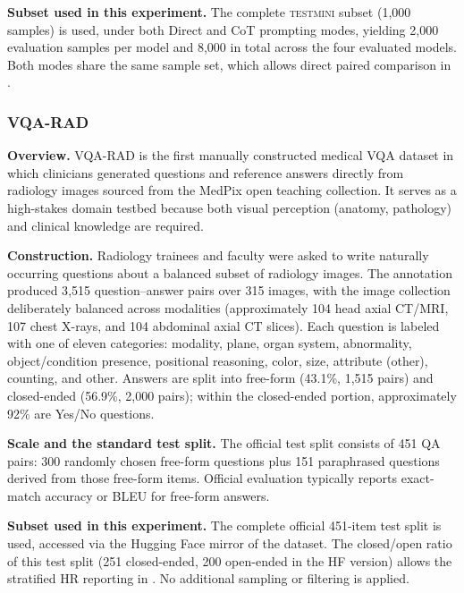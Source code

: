 \textbf{Subset used in this experiment.}
The complete \textsc{testmini} subset (1{,}000 samples) is used,
under both Direct and CoT prompting modes,
yielding 2{,}000 evaluation samples per model
and 8{,}000 in total across the four evaluated models.
Both modes share the same sample set,
which allows direct paired comparison
in .

\subsubsection{VQA-RAD}

\textbf{Overview.}
VQA-RAD \citep{lauDatasetClinicallyGenerated2018}
is the first manually constructed medical VQA dataset
in which clinicians generated questions and reference answers
directly from radiology images
sourced from the MedPix open teaching collection.
It serves as a high-stakes domain testbed
because both visual perception (anatomy, pathology)
and clinical knowledge are required.

\textbf{Construction.}
Radiology trainees and faculty were asked to write
naturally occurring questions
about a balanced subset of radiology images.
The annotation produced
3{,}515 question--answer pairs over 315 images,
with the image collection deliberately balanced across modalities
(approximately 104 head axial CT/MRI,
107 chest X-rays, and 104 abdominal axial CT slices).
Each question is labeled with one of eleven categories:
modality, plane, organ system, abnormality,
object/condition presence, positional reasoning,
color, size, attribute (other),
counting, and other.
Answers are split into
free-form (43.1\%, 1{,}515 pairs)
and closed-ended (56.9\%, 2{,}000 pairs);
within the closed-ended portion,
approximately 92\% are Yes/No questions.

\textbf{Scale and the standard test split.}
The official test split consists of 451 QA pairs:
300 randomly chosen free-form questions
plus 151 paraphrased questions
derived from those free-form items.
Official evaluation typically reports
exact-match accuracy or BLEU
for free-form answers.

\textbf{Subset used in this experiment.}
The complete official 451-item test split is used,
accessed via the Hugging Face mirror
of the dataset.
The closed/open ratio of this test split
(251 closed-ended, 200 open-ended in the HF version)
allows the stratified HR reporting in .
No additional sampling or filtering is applied.

